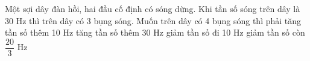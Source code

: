 \begin{vidu}%
Một sợi dây đàn hồi, hai đầu cố định có sóng dừng. Khi tần số sóng trên dây là 30 Hz thì trên dây có 3 bụng sóng. Muốn trên dây có 4 bụng sóng thì phải
\choice
{\True tăng tần số thêm 10 Hz}
{tăng tần số thêm 30 Hz}
{giảm tần số đi 10 Hz}
{giảm tần số còn $\dfrac{20}{3}$ Hz}
\end{vidu} %

